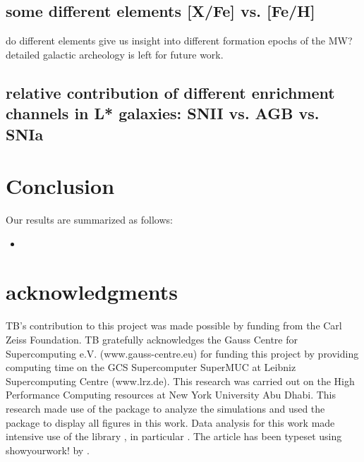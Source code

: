 \documentclass[useAMS,usenatbib]{mnras}
\begin{document}
\subsection{some different elements [X/Fe] vs. [Fe/H]}
do different elements give us insight into different formation epochs of the MW?
detailed galactic archeology is left for future work.

\subsection{relative contribution of different enrichment channels in L* galaxies: SNII vs. AGB vs. SNIa}


\section{Conclusion}
\label{sec:conclusion}



Our results are summarized as follows:
\begin{itemize}
%
\item 

\end{itemize}



\section*{acknowledgments}
TB's contribution to this project was made possible by funding from the Carl Zeiss Foundation. TB gratefully acknowledges the Gauss Centre for Supercomputing e.V. (www.gauss-centre.eu) for funding this project by providing computing time on the GCS Supercomputer SuperMUC at Leibniz Supercomputing Centre (www.lrz.de). This research was carried out on the High Performance Computing resources at New York University Abu Dhabi.
This research made use of the {} \citet{pynbody} package to analyze the simulations and used the {} package {} \citep{matplotlib} to display all figures in this work. Data analysis for this work made intensive use of the {} library {} \citep{scipy}, in particular {} \citep{numpy,ipython}. The article has been typeset using showyourwork! by \citet{Luger2021}.
\end{document}
